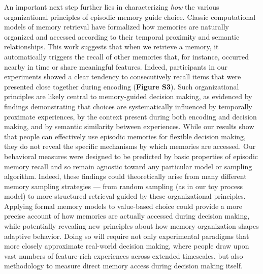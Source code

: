 \documentclass[10pt,letterpaper]{article}
\begin{document}
An important next step further lies in characterizing \textit{how} the various organizational principles of episodic memory guide choice. Classic computational models of memory retrieval have formalized how memories are naturally organized and accessed according to their temporal proximity and semantic relationships\cite{howardDistributedRepresentationTemporal2002, polynContextMaintenanceRetrieval2009, kahanaComputationalModelsMemory2020}. This work suggests that when we retrieve a memory, it automatically triggers the recall of other memories that, for instance, occurred nearby in time or share meaningful features. Indeed, participants in our experiments showed a clear tendency to consecutively recall items that were presented close together during encoding (\textbf{Figure S3}). Such organizational principles are likely central to memory-guided decision making, as evidenced by findings demonstrating that choices are systematically influenced by temporally proximate experiences\cite{bornsteinRemindersChoicesBias2017}, by the context present during both encoding\cite{duncanModulatingUseMultiple2019} and decision making\cite{bornsteinReinstatedEpisodicContext2017,duncanModulatingUseMultiple2019}, and by semantic similarity between experiences\cite{plonskyRelianceSmallSamples2015, akaWhatWhatRemember2021}. While our results show that people can effectively use episodic memories for flexible decision making, they do not reveal the specific mechanisms by which memories are accessed. Our behavioral measures were designed to be predicted by basic properties of episodic memory recall and so remain agnostic toward any particular model or sampling algorithm. Indeed, these findings could theoretically arise from many different memory sampling strategies --- from random sampling (as in our toy process model) to more structured retrieval guided by these organizational principles. Applying formal memory models to value-based choice could provide a more precise account of how memories are actually accessed during decision making, while potentially revealing new principles about how memory organization shapes adaptive behavior. Doing so will require not only experimental paradigms that more closely approximate real-world decision making, where people draw upon vast numbers of feature-rich experiences across extended timescales, but also methodology to measure direct memory access during decision making itself.
\end{document}
